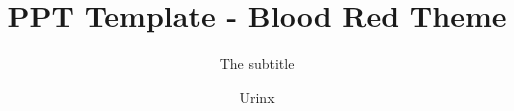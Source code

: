 \documentclass{presentation}
\title[Blood Red Theme]{PPT Template - Blood Red Theme}
\subtitle{The subtitle}
\author{Urinx}
\institute[HUST]{mkk@hust.edu.cn}
\begin{document}
\begin{frame}
    \titlepage
\end{frame}

\begin{frame}

\end{frame}
\end{document}
